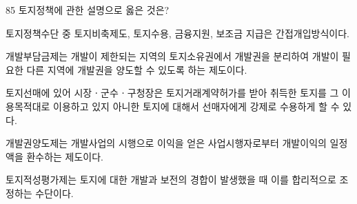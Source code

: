 \begin{question}{85}
토지정책에 관한 설명으로 옳은 것은?
\begin{choices}
  \item 토지정책수단 중 토지비축제도, 토지수용, 금융지원, 보조금 지급은 간접개입방식이다.
  \item 개발부담금제는 개발이 제한되는 지역의 토지소유권에서 개발권을 분리하여 개발이 필요한 다른 지역에 개발권을 양도할 수 있도록 하는 제도이다.
  \item 토지선매에 있어 시장ㆍ군수ㆍ구청장은 토지거래계약허가를 받아 취득한 토지를 그 이용목적대로 이용하고 있지 아니한 토지에 대해서 선매자에게 강제로 수용하게 할 수 있다.
  \item 개발권양도제는 개발사업의 시행으로 이익을 얻은 사업시행자로부터 개발이익의 일정액을 환수하는 제도이다.
  \item 토지적성평가제는 토지에 대한 개발과 보전의 경합이 발생했을 때 이를 합리적으로 조정하는 수단이다.
\end{choices}
\end{question}
